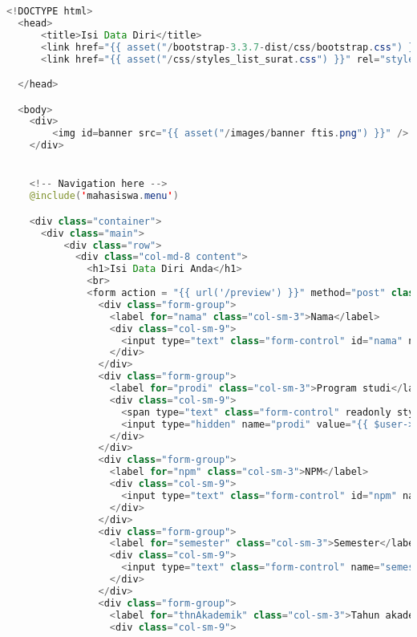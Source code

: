 \begin{lstlisting}[language=Java,basicstyle=\tiny,caption=Pengisian data keterangan beasiswa.blade.php]
	<!DOCTYPE html>
  <head>
      <title>Isi Data Diri</title>
      <link href="{{ asset("/bootstrap-3.3.7-dist/css/bootstrap.css") }}" rel="stylesheet" type="text/css" />
      <link href="{{ asset("/css/styles_list_surat.css") }}" rel="stylesheet" type="text/css">

  </head>

  <body>
    <div>
        <img id=banner src="{{ asset("/images/banner ftis.png") }}" />
    </div>


    <!-- Navigation here -->
    @include('mahasiswa.menu')

    <div class="container">
      <div class="main">
          <div class="row">
            <div class="col-md-8 content">
              <h1>Isi Data Diri Anda</h1>
              <br>
              <form action = "{{ url('/preview') }}" method="post" class="form-horizontal">
                <div class="form-group">
                  <label for="nama" class="col-sm-3">Nama</label>
                  <div class="col-sm-9">
                    <input type="text" class="form-control" id="nama" name="nama" value="{{ $user->nama_mahasiswa }}" readonly style="border: none" />
                  </div>
                </div>
                <div class="form-group">
                  <label for="prodi" class="col-sm-3">Program studi</label>
                  <div class="col-sm-9">
                    <span type="text" class="form-control" readonly style="border: none" >{{ $user->jurusan->nama_jurusan }}</span>
                    <input type="hidden" name="prodi" value="{{ $user->jurusan_id }}"/>
                  </div>
                </div>
                <div class="form-group">
                  <label for="npm" class="col-sm-3">NPM</label>
                  <div class="col-sm-9">
                    <input type="text" class="form-control" id="npm" name="npm" value="{{ $user->npm }}" readonly style="border: none">
                  </div>
                </div>
                <div class="form-group">
                  <label for="semester" class="col-sm-3">Semester</label>
                  <div class="col-sm-9">
                    <input type="text" class="form-control" name="semester" value="{{ $user->semester }}" readonly style="border: none" />
                  </div>
                </div>
                <div class="form-group">
                  <label for="thnAkademik" class="col-sm-3">Tahun akademik</label>
                  <div class="col-sm-9">

\end{lstlisting}
